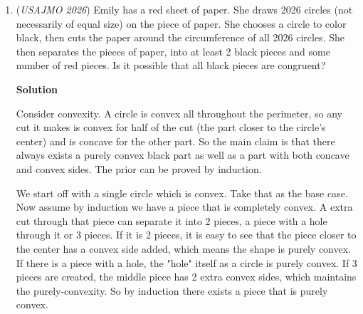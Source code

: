 \begin{enumerate}
            \begin{itemize}
        \item All numbers to the left of the 1 in $n$ are "2" or "0"
            \end{itemize}
            The last part is to count all such $n$. From any number, the digit 1 can be placed at an index $m$ from the left ($1 \leq m \leq 2026$). 

 There are exactly $2026 - m$ positions to the right of 1 that are all 9. Otherwise, there are exactly $m-1$ positions to the left of 1. Those have two choices each, giving $2^{m-1}$ cases. So, on any given integer with $m$ digits, we may form $2^{m-1}$ solitary integers.

 We sum over all $1 \leq m \leq 2026$, or

 
 \[\sum_{m = 1}^{2026} 2^{m-1} = 1+2+\dots+2^{2025} = \boxed{2^{2026}-1} \quad \square\].

 \textbf{Remark} REALLY annoying number theory problem

 


	\item (\textit{USAJMO 2026}) Emily has a red sheet of paper. She draws 2026 circles (not necessarily of equal size) on the piece of paper. She chooses a circle to color black, then cuts the paper around the circumference of all 2026 circles. She then separates the pieces of paper, into at least 2 black pieces and some number of red pieces. Is it possible that all black pieces are congruent?


 



\textbf{Solution}

Consider convexity. A circle is convex all throughout the perimeter, so any cut it makes is convex for half of the cut (the part closer to the circle's center) and is concave for the other part. So the main claim is that there always exists a purely convex black part as well as a part with both concave and convex sides. The prior can be proved by induction. 

 We start off with a single circle which is convex. Take that as the base case. Now assume by induction we have a piece that is completely convex. A extra cut through that piece can separate it into 2 pieces, a piece with a hole through it or 3 pieces. If it is 2 pieces, it is easy to see that the piece closer to the center has a convex side added, which means the shape is purely convex. If there is a piece with a hole, the "hole" itself as a circle is purely convex. If 3 pieces are created, the middle piece has 2 extra convex sides, which maintains the purely-convexity. So by induction there exists a piece that is purely convex.


\end{enumerate}
